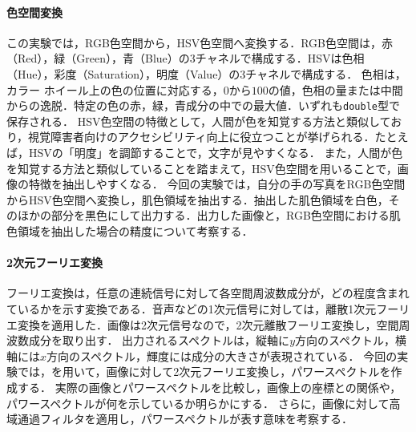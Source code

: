 \paragraph{色空間変換}この実験では，RGB色空間から，HSV色空間へ変換する．RGB色空間は，赤（Red），緑（Green），青（Blue）の3チャネルで構成する．HSVは色相（Hue），彩度（Saturation），明度（Value）の3チャネルで構成する．
色相は，カラー ホイール上の色の位置に対応する，\(0\)から\(100\)の値，色相の量または中間からの逸脱．特定の色の赤，緑，青成分の中での最大値．いずれも\texttt{double}型で保存される\cite{rgb2hsv}．
HSV色空間の特徴として，人間が色を知覚する方法と類似しており，視覚障害者向けのアクセシビリティ向上に役立つことが挙げられる．たとえば，HSVの「明度」を調節することで，文字が見やすくなる\cite[p.97\ -\ p.98]{画像処理}．
また，人間が色を知覚する方法と類似していることを踏まえて，HSV色空間を用いることで，画像の特徴を抽出しやすくなる．
今回の実験では，自分の手の写真をRGB色空間からHSV色空間へ変換し，肌色領域を抽出する．抽出した肌色領域を白色，そのほかの部分を黒色にして出力する．出力した画像と，RGB色空間における肌色領域を抽出した場合の精度について考察する．
\paragraph{2次元フーリエ変換}
フーリエ変換は，任意の連続信号に対して各空間周波数成分が，どの程度含まれているかを示す変換である．音声などの1次元信号に対しては，離散1次元フーリエ変換を適用した．画像は2次元信号なので，2次元離散フーリエ変換し，空間周波数成分を取り出す．
出力されるスペクトルは，縦軸に\(y\)方向のスペクトル，横軸には\(x\)方向のスペクトル，輝度には成分の大きさが表現されている．
今回の実験では，\matlab を用いて，画像に対して2次元フーリエ変換し，パワースペクトルを作成する．
実際の画像とパワースペクトルを比較し，画像上の座標との関係や，パワースペクトルが何を示しているか明らかにする．
さらに，画像に対して高域通過フィルタを適用し，パワースペクトルが表す意味を考察する．